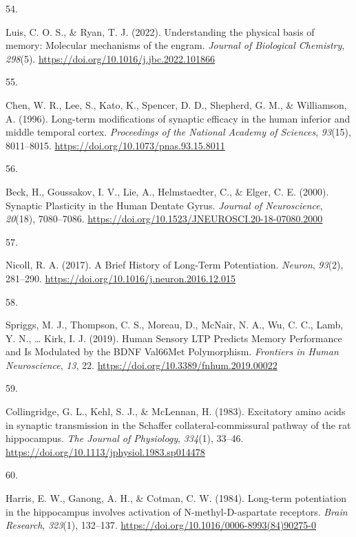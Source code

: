 \documentclass[
  11pt,
  letterpaper,
]{scrreprt}
\newlength{\cslhangindent}
\newlength{\csllabelwidth}
\newenvironment{CSLReferences}[2] %
 {\begin{list}{}{%
  \setlength{\itemindent}{0pt}
  \setlength{\leftmargin}{0pt}
  \setlength{\parsep}{0pt}
  \ifodd #1
   \setlength{\leftmargin}{\cslhangindent}
   \setlength{\itemindent}{-1\cslhangindent}
  \fi
  \setlength{\itemsep}{#2\baselineskip}}}
 {\end{list}}
\newcommand{\CSLLeftMargin}[1]{\parbox[t]{\csllabelwidth}{\strut#1\strut}}
\newcommand{\CSLRightInline}[1]{\parbox[t]{\linewidth - \csllabelwidth}{\strut#1\strut}}
\begin{document}
\begin{CSLReferences}{0}{0}
\CSLLeftMargin{54. }%
\CSLRightInline{Luis, C. O. S., \& Ryan, T. J. (2022). Understanding the
physical basis of memory: {Molecular} mechanisms of the engram.
\emph{Journal of Biological Chemistry}, \emph{298}(5).
\url{https://doi.org/10.1016/j.jbc.2022.101866}}

\CSLLeftMargin{55. }%
\CSLRightInline{Chen, W. R., Lee, S., Kato, K., Spencer, D. D.,
Shepherd, G. M., \& Williamson, A. (1996). Long-term modifications of
synaptic efficacy in the human inferior and middle temporal cortex.
\emph{Proceedings of the National Academy of Sciences}, \emph{93}(15),
8011--8015. \url{https://doi.org/10.1073/pnas.93.15.8011}}

\CSLLeftMargin{56. }%
\CSLRightInline{Beck, H., Goussakov, I. V., Lie, A., Helmstaedter, C.,
\& Elger, C. E. (2000). Synaptic {Plasticity} in the {Human Dentate
Gyrus}. \emph{Journal of Neuroscience}, \emph{20}(18), 7080--7086.
\url{https://doi.org/10.1523/JNEUROSCI.20-18-07080.2000}}

\CSLLeftMargin{57. }%
\CSLRightInline{Nicoll, R. A. (2017). A {Brief History} of {Long-Term
Potentiation}. \emph{Neuron}, \emph{93}(2), 281--290.
\url{https://doi.org/10.1016/j.neuron.2016.12.015}}

\CSLLeftMargin{58. }%
\CSLRightInline{Spriggs, M. J., Thompson, C. S., Moreau, D., McNair, N.
A., Wu, C. C., Lamb, Y. N., \ldots{} Kirk, I. J. (2019). Human {Sensory
LTP Predicts Memory Performance} and {Is Modulated} by the {BDNF
Val66Met Polymorphism}. \emph{Frontiers in Human Neuroscience},
\emph{13}, 22. \url{https://doi.org/10.3389/fnhum.2019.00022}}

\CSLLeftMargin{59. }%
\CSLRightInline{Collingridge, G. L., Kehl, S. J., \& McLennan, H.
(1983). Excitatory amino acids in synaptic transmission in the
{Schaffer} collateral-commissural pathway of the rat hippocampus.
\emph{The Journal of Physiology}, \emph{334}(1), 33--46.
\url{https://doi.org/10.1113/jphysiol.1983.sp014478}}

\CSLLeftMargin{60. }%
\CSLRightInline{Harris, E. W., Ganong, A. H., \& Cotman, C. W. (1984).
Long-term potentiation in the hippocampus involves activation of
{N-methyl-D-aspartate} receptors. \emph{Brain Research}, \emph{323}(1),
132--137. \url{https://doi.org/10.1016/0006-8993(84)90275-0}}


\end{CSLReferences}
\end{document}
